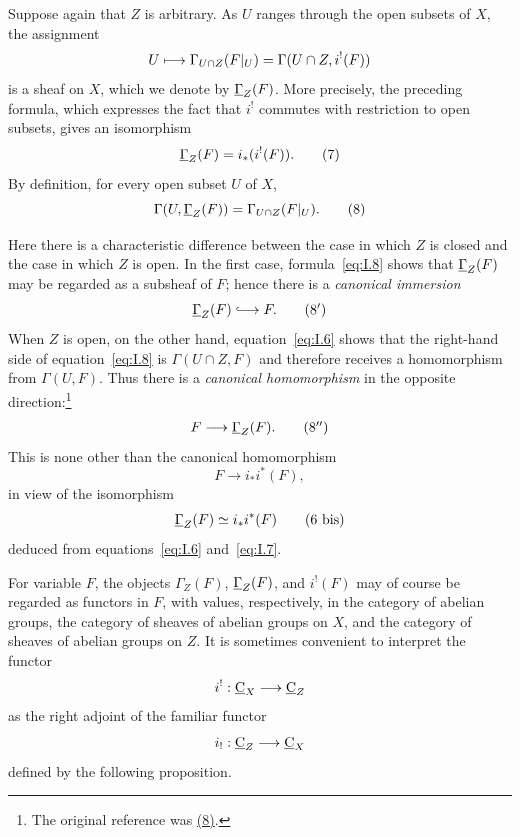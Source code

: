 Suppose again that $Z$ is arbitrary.  As $U$ ranges through the open
subsets of $X$, the assignment
\[
  U\longmapsto \Gamma_{U\cap Z}(F\vert_{U})
  =\Gamma(U\cap Z,i^!(F))
\]
is a sheaf on $X$, which we denote by $\mathop{\underline{\Gamma}}\nolimits_Z(F)$.  More precisely,
the preceding formula, which expresses the fact that $i^!$ commutes with
restriction to open subsets, gives an isomorphism
\begin{equation}
  \mathop{\underline{\Gamma}}\nolimits_Z(F)=i_*(i^!(F)).
  \tag{7}\label{eq:I.7}
\end{equation}
By definition, for every open subset $U$ of $X$,
\begin{equation}
  \Gamma(U,\mathop{\underline{\Gamma}}\nolimits_Z(F))
  =\Gamma_{U\cap Z}(F\vert_{U}).
  \tag{8}\label{eq:I.8}
\end{equation}

Here there is a characteristic difference between the case in which
$Z$ is closed and the case in which $Z$ is open.  In the first case,
formula~\eqref{eq:I.8} shows that $\mathop{\underline{\Gamma}}\nolimits_Z(F)$ may be regarded as a
subsheaf of $F$; hence there is a \emph{canonical immersion}
\begin{equation}
  \uGamma_Z(F)\lhook\joinrel\longrightarrow F.
  \tag{$8'$}\label{eq:I.8'}
\end{equation}
When $Z$ is open, on the other hand, equation~\eqref{eq:I.6} shows that
the right-hand side of equation~\eqref{eq:I.8} is
$\Gamma(U\cap Z,F)$ and therefore receives a homomorphism from
$\Gamma(U,F)$.  Thus there is a \emph{canonical homomorphism} in the
opposite direction:\footnote{The original reference was \hyperref[eq:I.8]{(8)}.}
\begin{equation}
  F\longrightarrow\mathop{\underline{\Gamma}}\nolimits_Z(F).
  \tag{$8''$}\label{eq:I.8''}
\end{equation}
This is none other than the canonical homomorphism
\[
  F\longrightarrow i_*i^*(F),
\]
in view of the isomorphism
\begin{equation}
  \mathop{\underline{\Gamma}}\nolimits_Z(F)\simeq i_*i^*(F)
  \tag{6 bis}\label{eq:I.6bis}
\end{equation}
deduced from equations~\eqref{eq:I.6} and~\eqref{eq:I.7}.

For variable $F$, the objects $\Gamma_Z(F)$, $\mathop{\underline{\Gamma}}\nolimits_Z(F)$, and
$i^!(F)$ may of course be regarded as functors in $F$, with values,
respectively, in the category of abelian groups, the category of sheaves
of abelian groups on $X$, and the category of sheaves of abelian groups
on $Z$.  It is sometimes convenient to interpret the functor
\[
  i^!: \underline{\mathrm C}_X\longrightarrow\underline{\mathrm C}_Z
\]
as the right adjoint of the familiar functor
\[
  i_!: \underline{\mathrm C}_Z\longrightarrow\underline{\mathrm C}_X
\]
defined by the following proposition.

